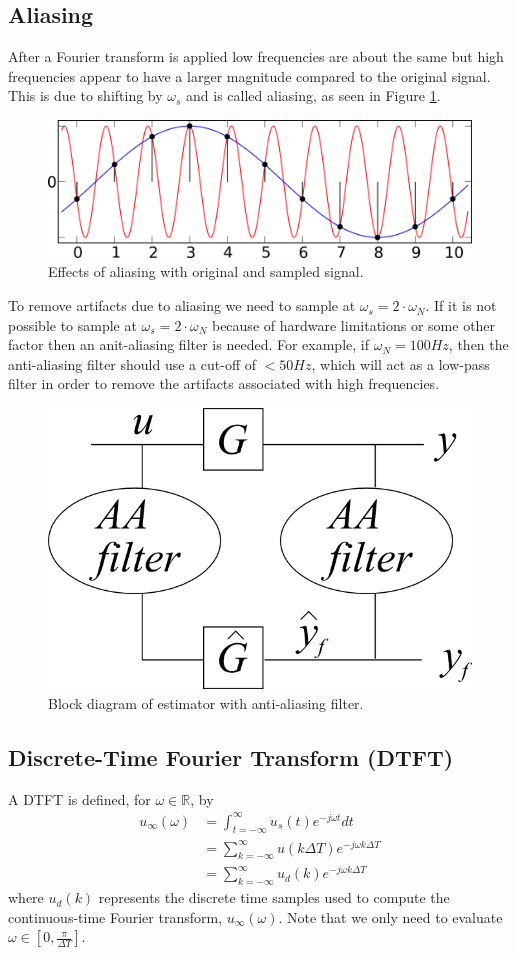 \documentclass[lecture,12pt,]{pcms-l}
\theoremstyle{example}
\newcommand{\tint}{\int_{t=-\infty}^\infty}
\newcommand{\w}{\omega}
\newcommand{\emjwt}{e^{-j\omega t}}
\begin{document}
\subsection{Aliasing}
After a Fourier transform is applied low frequencies are about the same but high frequencies appear to have a larger magnitude compared to the original signal. This is due to shifting by $\w_s$ and is called aliasing, as seen in Figure \ref{fig:02aliasingSines}.
\begin{figure}[ht!]
	\centering
	\includegraphics[width=.6\textwidth]{images/02aliasingSines}
	\caption{Effects of aliasing with original and sampled signal.}
	\label{fig:02aliasingSines}
\end{figure}

To remove artifacts due to aliasing we need to sample at $\w_s = 2\cdot\w_N$. If it is not possible to sample at $\w_s = 2\cdot\w_N$ because of hardware limitations or some other factor then an anit-aliasing filter is needed. For example, if $\w_N = 100 Hz$, then the anti-aliasing filter should use a cut-off of $< 50 Hz$, which will act as a low-pass filter in order to remove the artifacts associated with high frequencies.
\begin{figure}[ht!]
	\centering
	\includegraphics[width=.3\textwidth]{images/02aafilter}
	\caption{Block diagram of estimator with anti-aliasing filter.}
	\label{fig:02aafilter}
\end{figure}

\subsection{Discrete-Time Fourier Transform (DTFT)}
A DTFT is defined, for $\w\in\mathbb{R}$, by
\begin{align*}
u_\infty(\w) &= \tint u_s(t)\emjwt dt \\
&= \sum_{k=-\infty}^\infty u(k\Delta T) e^{-j\w k\Delta T} \\
&= \sum_{k=-\infty}^\infty u_d(k) e^{-j\w k\Delta T}
\end{align*}
where $u_d(k)$ represents the discrete time samples used to compute the continuous-time Fourier transform, $u_\infty(\w)$. Note that we only need to evaluate $\w\in[0, \frac{\pi}{\Delta T}]$.
\end{document}
